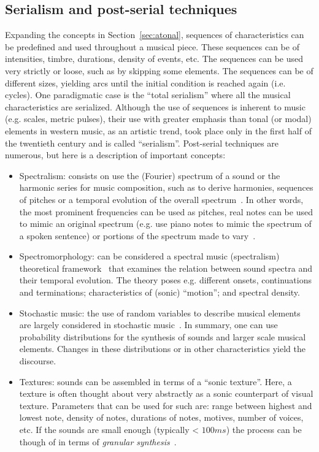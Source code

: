 \subsection{Serialism and post-serial techniques}
Expanding the concepts in Section~\ref{sec:atonal},
sequences of characteristics can be predefined and
used throughout a musical piece.
These sequences can be of intensities, timbre, durations,
density of events, etc.
The sequences can be used very strictly or loose,
such as by skipping some elements.
The sequences can be of different sizes, yielding arcs
until the initial condition is reached again (i.e. cycles).
One paradigmatic case is the ``total serialism'' where all
the musical characteristics are serialized.
Although the use of sequences is inherent to music (e.g. scales, metric pulses),
their use with greater emphasis than tonal (or modal) elements
in western music, as an artistic trend, took place only in the
first half of the twentieth century and is called ``serialism''.
Post-serial techniques are numerous, but here is a description of
important concepts:
\begin{itemize}
	\item Spectralism:
		consists on use the (Fourier) spectrum of a sound or the harmonic series for music composition,
		such as
		to derive harmonies, sequences of pitches or a temporal evolution of the overall spectrum~\cite{grisey}.
		In other words, the most prominent frequencies can be used as pitches,
		real notes can be used to mimic an original spectrum
		(e.g. use piano notes to mimic the spectrum of a spoken sentence) or portions of the spectrum made to vary~\cite{spectral}.
	\item Spectromorphology:
		can be considered a spectral music (spectralism) theoretical framework~\cite{smalley,schaeffer}
		that examines the relation between sound spectra and their temporal evolution.
		The theory poses e.g. different onsets, continuations and terminations; characteristics of (sonic) ``motion'';
		and spectral density.
	\item Stochastic music:
		the use of random variables to describe musical elements are largely considered in stochastic music~\cite{formalized}.
		In summary, one can use probability distributions for the synthesis of sounds and larger scale musical elements.
		Changes in these distributions or in other characteristics yield the discourse.
	\item Textures:
		sounds can be assembled in terms of a ``sonic texture''.
		Here, a texture is often thought about very abstractly
		as a sonic counterpart of visual texture.
		Parameters that can be used for such are: range between highest and lowest note,
		density of notes, durations of notes, motives, number of voices, etc.
		If the sounds are small enough (typically < $100ms$) the process can be though of in terms of \emph{granular synthesis}~\cite{microsound}.
\end{itemize}

